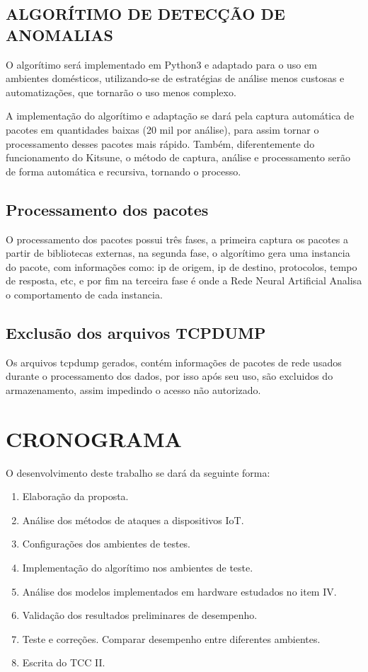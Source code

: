 \section{ALGORÍTIMO DE DETECÇÃO DE ANOMALIAS}
O algorítimo será implementado em Python3 e adaptado para o uso em ambientes domésticos, utilizando-se de estratégias de análise menos custosas e automatizações, que tornarão o uso menos complexo. 

A implementação do algorítimo e adaptação se dará pela captura automática de pacotes em quantidades baixas (20 mil por análise), para assim tornar o processamento desses pacotes mais rápido. Também, diferentemente do funcionamento do Kitsune, o método de captura, análise e processamento serão de forma automática e recursiva, tornando o processo.

\section{Processamento dos pacotes}
O processamento dos pacotes possui três fases, a primeira captura os pacotes a partir de bibliotecas externas, na segunda fase, o algorítimo gera uma instancia do pacote, com informações como: ip de origem, ip de destino, protocolos, tempo de resposta, etc, e por fim na terceira fase é onde a Rede Neural Artificial Analisa o comportamento de cada instancia.

\section{Exclusão dos arquivos TCPDUMP}
Os arquivos tcpdump gerados, contém informações de pacotes de rede usados durante o processamento dos dados, por isso após seu uso, são excluidos do armazenamento, assim impedindo o acesso não autorizado.

\chapter{CRONOGRAMA}

O desenvolvimento deste trabalho se dará da seguinte forma:

\begin{enumerate}
	\item \label{ela-pro} Elaboração da proposta.
	\item \label{anI} Análise dos métodos de ataques a dispositivos IoT.
	\item \label{anII} Configurações dos ambientes de testes.
	\item \label{anIII} Implementação do algorítimo nos ambientes de teste. 
	\item \label{dI} Análise dos modelos implementados em hardware estudados no item IV.
		\item \label{dII} Validação dos resultados preliminares de desempenho.
	\item \label{tec} Teste e correções.
		\subitem Comparar desempenho entre diferentes ambientes.
	\item \label{esc-tcII} Escrita do TCC II.
\end{enumerate}

